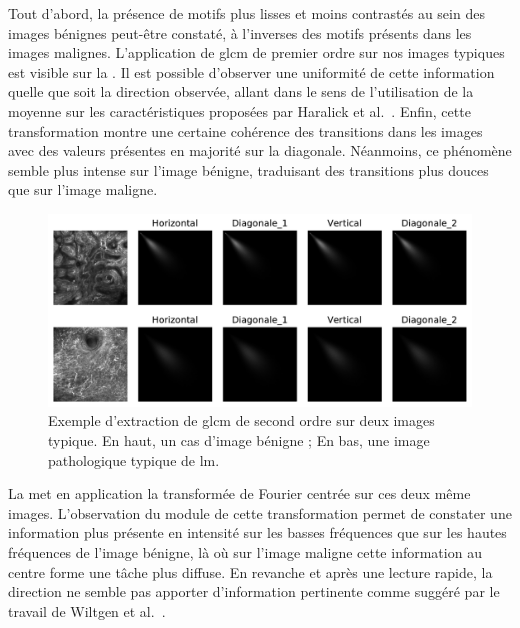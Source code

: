 Tout d'abord, la présence de motifs plus lisses et moins contrastés au sein des images bénignes peut-être constaté, à l'inverses des motifs présents dans les images malignes. L'application de \gls{glcm} de premier ordre sur nos images typiques est visible sur la . Il est possible d'observer une uniformité de cette information quelle que soit la direction observée, allant dans le sens de l'utilisation de la moyenne sur les caractéristiques proposées par Haralick et al.~\cite{Wiltgen2008}. Enfin, cette transformation montre une certaine cohérence des transitions dans les images avec des valeurs présentes en majorité sur la diagonale. Néanmoins, ce phénomène semble plus intense sur l'image bénigne, traduisant des transitions plus douces que sur l'image maligne.\par

\begin{figure}[H]
    \centering
    \includegraphics[width=\linewidth]{contents/chapter_5/resources/example_glcm.pdf}
    \caption{Exemple d'extraction de \gls{glcm} de second ordre sur deux images typique. En haut, un cas d'image bénigne ; En bas, une image pathologique typique de \gls{lm}.}
    \label{fig:example_glcm}
\end{figure}\par

La  met en application la transformée de Fourier centrée sur ces deux même images. L'observation du module de cette transformation permet de constater une information plus présente en intensité sur les basses fréquences que sur les hautes fréquences de l'image bénigne, là où sur l'image maligne cette information au centre forme une tâche plus diffuse. En revanche et après une lecture rapide, la direction ne semble pas apporter d'information pertinente comme suggéré par le travail de Wiltgen et al.~\cite{Wiltgen2008}.\par

